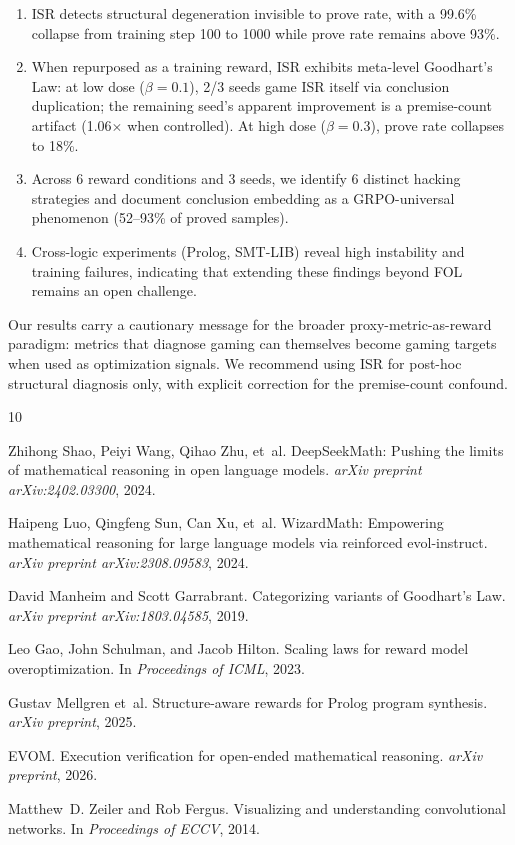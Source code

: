 \documentclass[11pt,a4paper]{article}
\newcommand{\ISR}{\textsc{ISR}}
\begin{document}
\begin{enumerate}
\item \ISR{} detects structural degeneration invisible to prove rate, with a 99.6\% collapse from training step 100 to 1000 while prove rate remains above 93\%.
\item When repurposed as a training reward, \ISR{} exhibits meta-level Goodhart's Law: at low dose ($\beta{=}0.1$), 2/3 seeds game \ISR{} itself via conclusion duplication; the remaining seed's apparent improvement is a premise-count artifact (1.06$\times$ when controlled). At high dose ($\beta{=}0.3$), prove rate collapses to 18\%.
\item Across 6 reward conditions and 3 seeds, we identify 6 distinct hacking strategies and document conclusion embedding as a GRPO-universal phenomenon (52--93\% of proved samples).
\item Cross-logic experiments (Prolog, SMT-LIB) reveal high instability and training failures, indicating that extending these findings beyond FOL remains an open challenge.
\end{enumerate}

Our results carry a cautionary message for the broader proxy-metric-as-reward paradigm: metrics that diagnose gaming can themselves become gaming targets when used as optimization signals. We recommend using \ISR{} for post-hoc structural diagnosis only, with explicit correction for the premise-count confound.

\begin{thebibliography}{10}

Zhihong Shao, Peiyi Wang, Qihao Zhu, et~al.
DeepSeekMath: Pushing the limits of mathematical reasoning in open language models.
\textit{arXiv preprint arXiv:2402.03300}, 2024.

Haipeng Luo, Qingfeng Sun, Can Xu, et~al.
WizardMath: Empowering mathematical reasoning for large language models via reinforced evol-instruct.
\textit{arXiv preprint arXiv:2308.09583}, 2024.

David Manheim and Scott Garrabrant.
Categorizing variants of Goodhart's Law.
\textit{arXiv preprint arXiv:1803.04585}, 2019.

Leo Gao, John Schulman, and Jacob Hilton.
Scaling laws for reward model overoptimization.
In \textit{Proceedings of ICML}, 2023.

Gustav Mellgren et~al.
Structure-aware rewards for Prolog program synthesis.
\textit{arXiv preprint}, 2025.

EVOM.
Execution verification for open-ended mathematical reasoning.
\textit{arXiv preprint}, 2026.

Matthew~D. Zeiler and Rob Fergus.
Visualizing and understanding convolutional networks.
In \textit{Proceedings of ECCV}, 2014.

\end{thebibliography}
\end{document}
